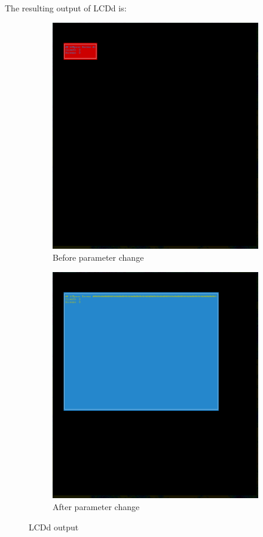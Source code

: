 \documentclass[draft,final]{vutinfth} %
\begin{document}
The resulting output of LCDd is:
\FloatBarrier
\begin{figure}[!ht]
	\centering
	\begin{subfigure}[b]{0.4\linewidth}
		\includegraphics[width=\linewidth]{graphics/lcdd_vanilla.png}
		\caption{Before parameter change}
	\end{subfigure}
	\begin{subfigure}[b]{0.4\linewidth}
		\includegraphics[width=\linewidth]{graphics/lcdd_changed.png}
		\caption{After parameter change}
	\end{subfigure}
  \caption{LCDd output}
\label{fig:lcdd}
\end{figure}
\end{document}

